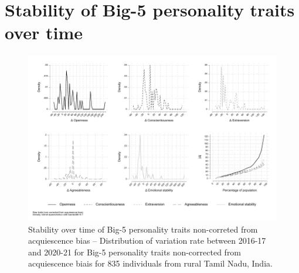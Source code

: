 \documentclass[a4paper, 11pt, onecolumn]{article}
\begin{document}
\section{Stability of Big-5 personality traits over time}
\label{section:stab_big5}



\begin{figure}[!htb]
\raggedright
\includegraphics[scale=0.86]{INPUT/deltacont_raw}
\caption{Stability over time of Big-5 personality traits non-correted from acquiescence bias -- Distribution of variation rate between 2016-17 and 2020-21 for Big-5 personality traits non-corrected from acquiescence biais for 835 individuals from rural Tamil Nadu, India.}
\label{fig:stabraw}
\end{figure}
\end{document}
